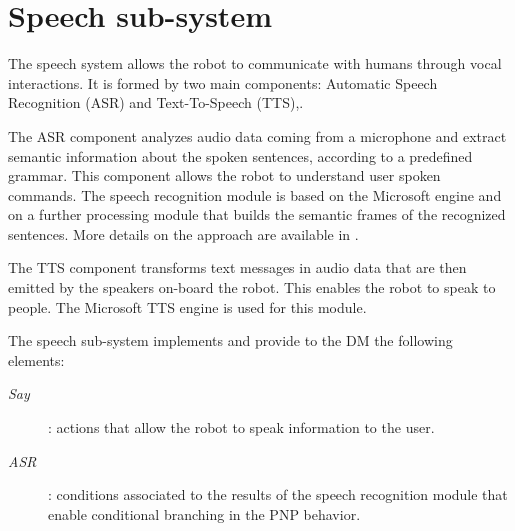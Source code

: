 \section{Speech sub-system}

The speech system allows the robot to communicate with humans through vocal interactions. 
It  is formed by two main components:
Automatic Speech Recognition (ASR) and Text-To-Speech (TTS),.

The ASR component analyzes audio data coming from a microphone and extract semantic information about the spoken sentences, according to a predefined grammar. This component allows the robot to understand user spoken commands.
The speech recognition module is based on the Microsoft engine and on a further processing module that builds the semantic frames of the recognized sentences.
More details on the approach are available in \cite{Ba...}.

The TTS component transforms text messages in audio data that are then emitted by the speakers on-board the robot. This enables the robot to speak to people. The Microsoft TTS engine is used for this module.


The speech sub-system implements and provide to the DM the following elements:

\begin{description}
\item[\emph{Say}]: actions that allow the robot to speak information to the user.
\item[\emph{ASR}]: conditions associated to the results of the speech recognition module that enable conditional branching in the PNP behavior.
\end{description}



